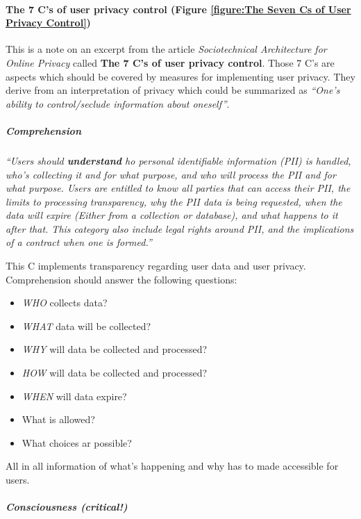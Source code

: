 \paragraph{The 7 C's of user privacy control (Figure \ref{figure:The Seven Cs of User Privacy Control})}

This is a note on an excerpt from the article \emph{Sociotechnical
Architecture for Online Privacy} \cite{1} called
\textbf{The 7 C's of user privacy control}. Those 7 C's are aspects
which should be covered by measures for implementing user privacy. They
derive from an interpretation of privacy which could be summarized as
\emph{``One's ability to control/seclude information about oneself''}.



\subparagraph{Comprehension}

\emph{``Users should \textbf{understand} ho personal identifiable
information (PII) is handled, who's collecting it and for what purpose,
and who will process the PII and for what purpose. Users are entitled
to know all parties that can access their PII, the limits to processing
transparency, why the PII data is being requested, when the data will
expire (Either from a collection or database), and what happens to it
after that. This category also include legal rights around PII, and the
implications of a contract when one is formed.''}

This C implements transparency regarding user data and user privacy.
Comprehension should answer the following questions:

\begin{itemize}

\item
  \emph{WHO} collects data?
\item
  \emph{WHAT} data will be collected?
\item
  \emph{WHY} will data be collected and processed?
\item
  \emph{HOW} will data be collected and processed?
\item
  \emph{WHEN} will data expire?
\item
  What is allowed?
\item
  What choices ar possible?
\end{itemize}

All in all information of what's happening and why has to made
accessible for users.

\subparagraph{Consciousness \textbf{(critical!)}}

